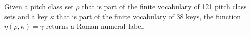
Given a pitch class set $\rho$ that is part of the finite
vocabulary of 121 pitch class sets and a key $\kappa$ that
is part of the finite vocabulary of 38 keys, the function
$\eta(\rho, \kappa) = \gamma$ returns a Roman numeral label.
